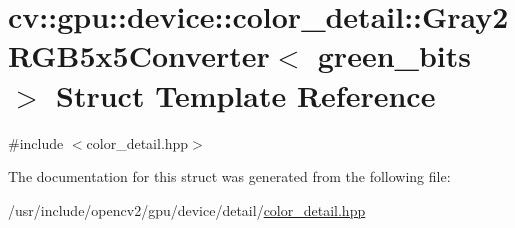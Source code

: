 \hypertarget{structcv_1_1gpu_1_1device_1_1color__detail_1_1Gray2RGB5x5Converter}{\section{cv\-:\-:gpu\-:\-:device\-:\-:color\-\_\-detail\-:\-:Gray2\-R\-G\-B5x5\-Converter$<$ green\-\_\-bits $>$ Struct Template Reference}
\label{structcv_1_1gpu_1_1device_1_1color__detail_1_1Gray2RGB5x5Converter}
}


{\ttfamily \#include $<$color\-\_\-detail.\-hpp$>$}



The documentation for this struct was generated from the following file\-:\begin{DoxyCompactItemize}
\item 
/usr/include/opencv2/gpu/device/detail/\hyperlink{color__detail_8hpp}{color\-\_\-detail.\-hpp}\end{DoxyCompactItemize}
